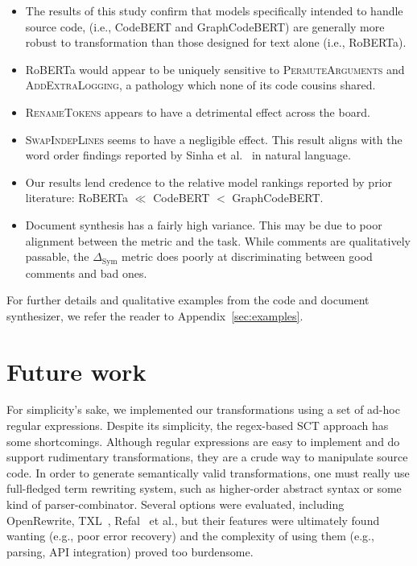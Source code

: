 \documentclass[usenames,dvipsnames]{article} %
\begin{document}
  \begin{itemize}
    \item The results of this study confirm that models specifically intended to handle source code, (i.e., CodeBERT and GraphCodeBERT) are generally more robust to transformation than those designed for text alone (i.e., RoBERTa).
    \item RoBERTa would appear to be uniquely sensitive to \textsc{PermuteArguments} and \textsc{AddExtraLogging}, a pathology which none of its code cousins shared.
    \item \textsc{RenameTokens} appears to have a detrimental effect across the board.
    \item \textsc{SwapIndepLines} seems to have a negligible effect. This result aligns with the word order findings reported by Sinha et al.~\citep{sinha2021masked} in natural language.
    \item Our results lend credence to the relative model rankings reported by prior literature: RoBERTa $\ll$ CodeBERT $<$ GraphCodeBERT.
    \item Document synthesis has a fairly high variance. This may be due to poor alignment between the metric and the task. While comments are qualitatively passable, the $\Delta_{\text{Sym}}$ metric does poorly at discriminating between good comments and bad ones.
  \end{itemize}

 For further details and qualitative examples from the code and document synthesizer, we refer the reader to Appendix~\ref{sec:examples}.

  \section{Future work}

  For simplicity's sake, we implemented our transformations using a set of ad-hoc regular expressions. Despite its simplicity, the regex-based SCT approach has some shortcomings. Although regular expressions are easy to implement and do support rudimentary transformations, they are a crude way to manipulate source code. In order to generate semantically valid transformations, one must really use full-fledged term rewriting system, such as higher-order abstract syntax or some kind of parser-combinator. Several options were evaluated, including OpenRewrite, TXL~\citep{cordy2004txl}, Refal~\citep{gurin1991refal} et al., but their features were ultimately found wanting (e.g., poor error recovery) and the complexity of using them (e.g., parsing, API integration) proved too burdensome.
\end{document}
